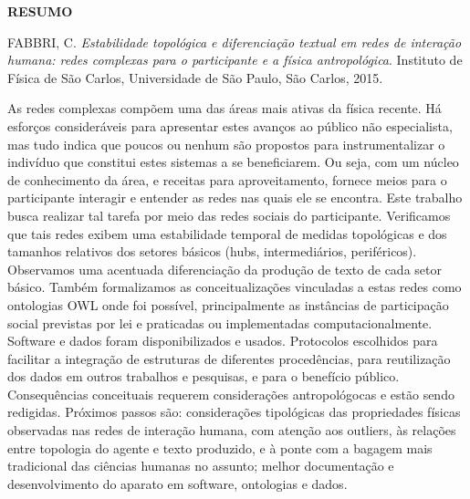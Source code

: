 \documentclass[a4paper,openright,12pt]{report} %
\begin{document}
\begin{singlespace}

\centerline{\LARGE{{\bf RESUMO}}}

\vspace*{1.5cm}


\hspace*{-0.9cm} FABBRI, C. \textit{Estabilidade topológica e diferenciação textual
em redes de interação humana:
redes complexas para o participante
e a física antropológica}. 
Instituto de Física de São Carlos, Universidade de São Paulo, São Carlos, 2015. 

\vspace*{1.2cm}

\hspace*{-0.9cm}

{\noindent
    As redes complexas compõem uma das áreas mais ativas da física recente.
    Há esforços consideráveis para apresentar estes avanços ao público não especialista, mas tudo indica
    que poucos ou nenhum são propostos para instrumentalizar o indivíduo que constitui estes sistemas a se beneficiarem.
    Ou seja, com um núcleo de conhecimento da área, e receitas para aproveitamento,
    fornece meios para o participante interagir e entender as redes nas quais ele se encontra.
    Este trabalho busca realizar tal tarefa por meio das redes sociais do participante.
    Verificamos que tais redes exibem uma estabilidade temporal de medidas topológicas e dos
    tamanhos relativos dos setores básicos (hubs, intermediários, periféricos).
    Observamos uma acentuada diferenciação da produção de texto de cada setor básico.
    Também formalizamos as conceitualizações vinculadas a estas redes como ontologias OWL onde foi possível,
    principalmente as instâncias de participação social previstas por lei e praticadas ou implementadas computacionalmente.
    Software e dados foram disponibilizados e usados. Protocolos escolhidos para
    facilitar a integração de estruturas de diferentes procedências,
    para reutilização dos dados em outros trabalhos e pesquisas, e para o benefício público.
    Consequências conceituais requerem considerações antropológocas e estão sendo redigidas.
    Próximos passos são: 
    considerações tipológicas das propriedades físicas observadas nas redes de interação humana, com
    atenção aos outliers, às relações entre topologia do agente e texto produzido, e à ponte com
    a bagagem mais tradicional das ciências humanas no assunto;
    melhor documentação e desenvolvimento do aparato em software, ontologias e dados.
}


\end{singlespace}
\end{document}

